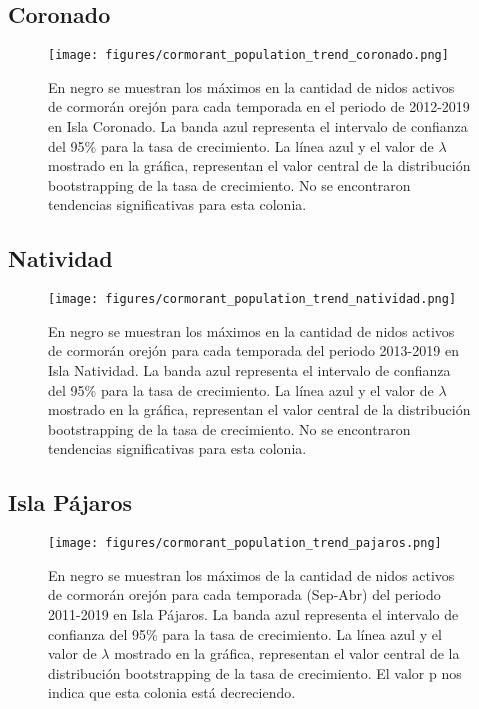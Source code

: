 \documentclass{article} %
\begin{document}
\subsection*{Coronado}

\begin{figure}[H]
\hspace{-2cm}
    \texttt{[image: figures/cormorant\_population\_trend\_coronado.png]}
\caption{En negro se muestran los máximos en la cantidad de nidos activos de cormorán orejón para cada temporada en el periodo de 2012-2019 en Isla Coronado. La banda azul representa el intervalo de confianza del 95\% para la tasa de crecimiento. La línea azul y el valor de $\lambda$ mostrado en la gráfica, representan el valor central de la distribución bootstrapping de la tasa de crecimiento. No se encontraron tendencias significativas para esta colonia.}
\end{figure}

\subsection*{Natividad}

\begin{figure}[H]
\hspace{-2cm}
    \texttt{[image: figures/cormorant\_population\_trend\_natividad.png]}
\caption{En negro se muestran los máximos en la cantidad de nidos activos de cormorán orejón para cada temporada del periodo 2013-2019 en Isla Natividad. La banda azul representa el intervalo de confianza del 95\% para la tasa de crecimiento. La línea azul y el valor de $\lambda$ mostrado en la gráfica, representan el valor central de la distribución bootstrapping de la tasa de crecimiento. No se encontraron tendencias significativas para esta colonia.}
\end{figure}

\subsection*{Isla Pájaros}

\begin{figure}[H]
\hspace{-2cm}
    \texttt{[image: figures/cormorant\_population\_trend\_pajaros.png]}
\caption{En negro se muestran los máximos de la cantidad de nidos activos de cormorán orejón para cada temporada (Sep-Abr) del periodo 2011-2019 en Isla Pájaros. La banda azul representa el intervalo de confianza del 95\% para la tasa de crecimiento. La línea azul y el valor de $\lambda$ mostrado en la gráfica, representan el valor central de la distribución bootstrapping de la tasa de crecimiento. El valor p nos indica que esta colonia está decreciendo.}
\end{figure}
\end{document}
